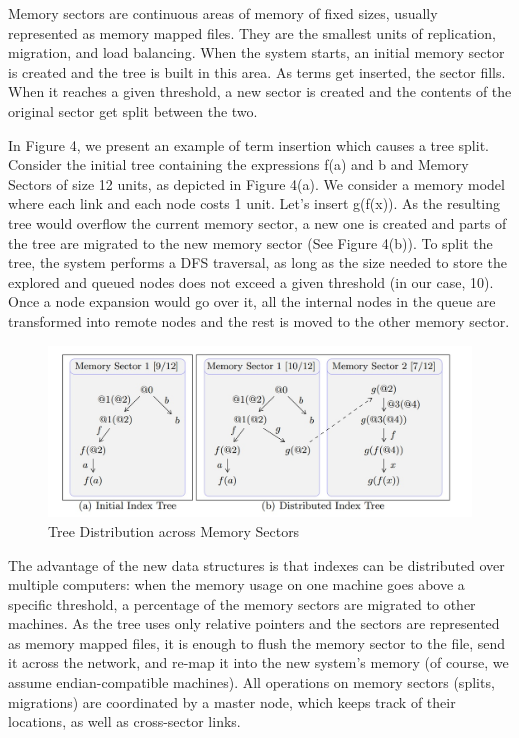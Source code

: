 \documentclass{deliverablereport}
\begin{document}
Memory sectors are continuous areas of memory of fixed sizes, usually represented as memory mapped files. They are the smallest units of replication, migration, and load balancing. When the system starts, an initial memory sector is created and the tree is built in this area. As terms get inserted, the sector fills. When it reaches a given threshold, a new sector is created and the contents of the original sector get split between the two. 

In Figure 4, we present an example of term insertion which causes a tree split. Consider the initial tree containing the expressions f(a) and b and Memory Sectors of size 12 units, as depicted in Figure 4(a). We consider a memory model where each link and each node costs 1 unit. Let’s insert g(f(x)). As the resulting tree would overflow the current memory sector, a new one is created and parts of the tree are migrated to the new memory sector (See Figure 4(b)). To split the tree, the system performs a DFS traversal, as long as the size needed to store the explored and queued nodes does not exceed a given threshold (in our case, 10). Once a node expansion would go over it, all the internal nodes in the queue are transformed into remote nodes and the rest is moved to the other memory sector. 

\begin{figure}[h]
\centering
 \includegraphics[scale=0.6]{figure4.jpg}
 \caption{Tree Distribution across Memory Sectors}
\end{figure}

The advantage of the new data structures is that indexes can be distributed over multiple computers: when the memory usage on one machine goes above a specific threshold, a percentage of the memory sectors are migrated to other machines. As the tree uses only relative pointers and the sectors are represented as memory mapped files, it is enough to flush the memory sector to the file, send it across the network, and re-map it into the new system’s memory (of course, we assume endian-compatible machines). All operations on memory sectors (splits, migrations) are coordinated by a master node, which keeps track of their locations, as well as cross-sector links. 
\end{document}
